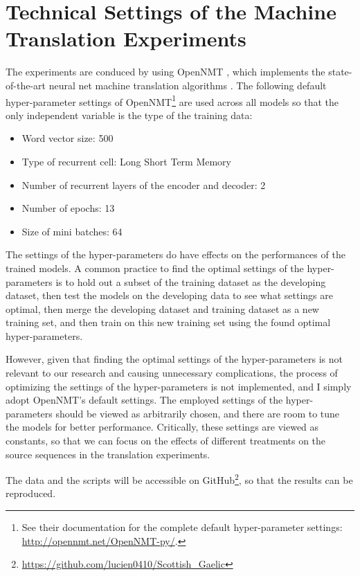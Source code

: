 \documentclass[a4paper]{article}
\begin{document}
\section{Technical Settings of the Machine Translation Experiments}\label{sec:experimet_setting}
The experiments are conduced by using OpenNMT \citep{2017opennmt}, which implements the state-of-the-art neural net machine translation algorithms \citep{cho2014properties, cho2014learning, bahdanau2014neural}. 
The following default hyper-parameter settings of OpenNMT\footnote{See their documentation for the complete default hyper-parameter settings: \url{http://opennmt.net/OpenNMT-py/}.} are used across all models so that the only independent variable is the type of the training data: 
\begin{itemize}
\item Word vector size: 500
\item Type of recurrent cell: Long Short Term Memory
\item Number of recurrent layers of the encoder and decoder: 2
\item Number of epochs: 13 
\item Size of mini batches: 64 
\end{itemize}

The settings of the hyper-parameters do have effects on the performances of the trained models. 
A common practice to find the optimal settings of the hyper-parameters is to hold out a subset of the training dataset as the developing dataset, then test the models on the developing data to see what settings are optimal, then merge the developing dataset and training dataset as a new training set, and then train on this new training set using the found optimal hyper-parameters. 

However, given that finding the optimal settings of the hyper-parameters is not relevant to our research and causing unnecessary complications, the process of optimizing the settings of the hyper-parameters is not implemented, and I simply adopt OpenNMT's default settings. The employed settings of the hyper-parameters should be viewed as arbitrarily chosen, and there are room to tune the models for better performance. Critically, these settings are viewed as constants, so that we can focus on the effects of different treatments on the source sequences in the translation experiments.

The data and the scripts will be accessible on GitHub\footnote{\url{https://github.com/lucien0410/Scottish_Gaelic}}, so that the results can be reproduced.   
\end{document}
